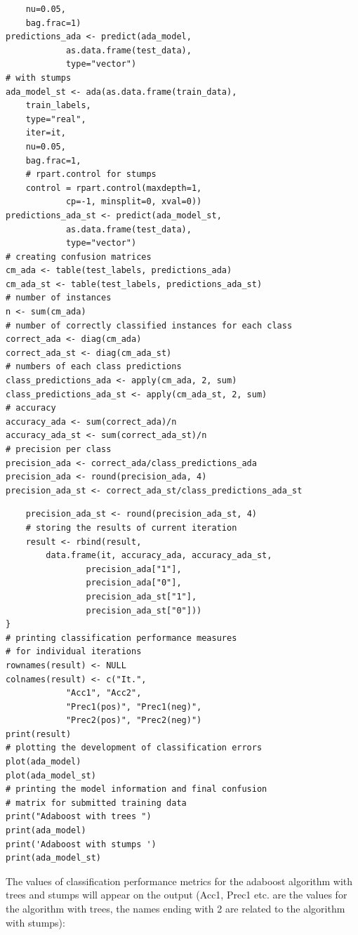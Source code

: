 \begin{verbatim}
    nu=0.05,
    bag.frac=1)
predictions_ada <- predict(ada_model,
            as.data.frame(test_data),
            type="vector")
# with stumps
ada_model_st <- ada(as.data.frame(train_data),
    train_labels,
    type="real",
    iter=it,
    nu=0.05,
    bag.frac=1,
    # rpart.control for stumps
    control = rpart.control(maxdepth=1,
            cp=-1, minsplit=0, xval=0))
predictions_ada_st <- predict(ada_model_st,
            as.data.frame(test_data),
            type="vector")
# creating confusion matrices
cm_ada <- table(test_labels, predictions_ada)
cm_ada_st <- table(test_labels, predictions_ada_st)
# number of instances
n <- sum(cm_ada)
# number of correctly classified instances for each class
correct_ada <- diag(cm_ada)
correct_ada_st <- diag(cm_ada_st)
# numbers of each class predictions
class_predictions_ada <- apply(cm_ada, 2, sum)
class_predictions_ada_st <- apply(cm_ada_st, 2, sum)
# accuracy
accuracy_ada <- sum(correct_ada)/n
accuracy_ada_st <- sum(correct_ada_st)/n
# precision per class
precision_ada <- correct_ada/class_predictions_ada
precision_ada <- round(precision_ada, 4)
precision_ada_st <- correct_ada_st/class_predictions_ada_st
\end{verbatim}

\begin{verbatim}
    precision_ada_st <- round(precision_ada_st, 4)
    # storing the results of current iteration
    result <- rbind(result,
        data.frame(it, accuracy_ada, accuracy_ada_st,
                precision_ada["1"],
                precision_ada["0"],
                precision_ada_st["1"],
                precision_ada_st["0"]))
}
# printing classification performance measures
# for individual iterations
rownames(result) <- NULL
colnames(result) <- c("It.",
            "Acc1", "Acc2",
            "Prec1(pos)", "Prec1(neg)",
            "Prec2(pos)", "Prec2(neg)")
print(result)
# plotting the development of classification errors
plot(ada_model)
plot(ada_model_st)
# printing the model information and final confusion
# matrix for submitted training data
print("Adaboost with trees ")
print(ada_model)
print('Adaboost with stumps ')
print(ada_model_st)
\end{verbatim}

The values of classification performance metrics for the adaboost algorithm with trees and stumps will appear on the output (Acc1, Prec1 etc. are the values for the algorithm with trees, the names ending with 2 are related to the algorithm with stumps):

